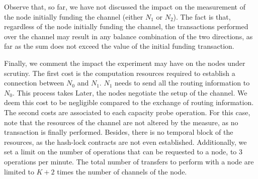 Observe that, so far, we have not discussed the impact on the measurement of the node initially funding the channel (either $N_1$ or $N_2$).
The fact is that, regardless of the node initially funding the channel, the transactions performed over the channel may result in any balance combination of the two directions, as far as the sum does not exceed \ed{[EQUALS??]} the value of the initial funding transaction. 

Finally, we comment the impact the experiment may have on the nodes under scrutiny.
The first cost is the computation resources required to establish a connection between $N_0$ and $N_1$. 
$N_1$ needs to send all the routing information to $N_0$. This process takes  
Later, the nodes negotiate the setup of the channel. We deem this cost to be negligible compared to the exchange of routing information.
The second costs are associated to each capacity probe operation. For this case, 
note that the resources of the channel are not altered by the measure, as no transaction is finally performed. 
Besides, there is no temporal block of the resources, as the hash-lock contracts are not even established.
Additionally, we set a limit on the number of operations that can be requested to a node, to 3 operations per minute. 
The total number of transfers to perform with a node are limited to $K + 2$ times the number of channels of the node.